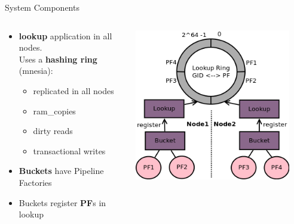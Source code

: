 \documentclass[aspectratio=169]{beamer}
\begin{document}
\begin{frame}{System Components}
    \begin{columns}
        \begin{column}[c]{0.5\textwidth}
            \begin{itemize}
                \item \textbf{lookup} application in all nodes.\\
                      Uses a \textbf{hashing ring} (mnesia):
                            \begin{itemize}
                                \item replicated in all nodes
                                \item ram\_copies
                                \item dirty reads
                                \item transactional writes
                            \end{itemize}
                \item \textbf{Buckets} have Pipeline Factories
                \item Buckets register \textbf{PF}s in lookup
            \end{itemize}
        \end{column}
        \begin{column}[c]{0.5\textwidth}
            \includegraphics[width=0.9\textwidth]{images/components.png}
        \end{column}
    \end{columns}
\end{frame}
\end{document}
